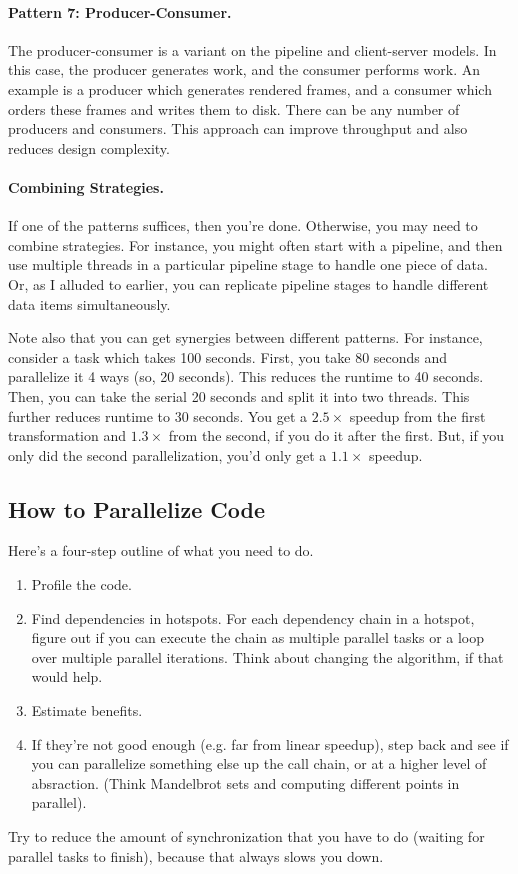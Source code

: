 \documentclass[a4paper]{report}
\begin{document}
\paragraph{Pattern 7: Producer-Consumer.} The producer-consumer is 
a variant on the pipeline and client-server models. In this case, the
producer generates work, and the consumer performs work. An example is
a producer which generates rendered frames, and a consumer which
orders these frames and writes them to disk. There can be any number
of producers and consumers. This approach can improve throughput
and also reduces design complexity.

\paragraph{Combining Strategies.} If one of the patterns suffices,
then you're done. Otherwise, you may need to combine strategies.
For instance, you might often start with a pipeline, and then 
use multiple threads in a particular pipeline stage to handle one
piece of data. Or, as I alluded to earlier, you can replicate
pipeline stages to handle different data items simultaneously.

Note also that you can get synergies between different patterns.
For instance, consider a task which takes 100 seconds. First, you
take 80 seconds and parallelize it 4 ways (so, 20 seconds). This
reduces the runtime to 40 seconds. Then, you can take the serial 
20 seconds and split it into two threads. This further reduces 
runtime to 30 seconds. You get a $2.5\times$ speedup from the
first transformation and $1.3\times$ from the second, if you do it
after the first. But, if you only did the second parallelization,
you'd only get a $1.1\times$ speedup.

\subsection*{How to Parallelize Code}
Here's a four-step outline of what you need to do.
\begin{enumerate}
\item Profile the code.
\item Find dependencies in hotspots. For each dependency chain in
a hotspot, figure out if you can execute the chain as
multiple parallel tasks or a loop over multiple parallel iterations.
Think about changing the algorithm, if that would help.
\item Estimate benefits. 
\item If they're not good enough (e.g. far from linear speedup),
step back and see if you can parallelize something else up the
call chain, or at a higher level of absraction.
(Think Mandelbrot sets and computing different points in parallel).
\end{enumerate}
Try to reduce the amount of synchronization that you have to do
(waiting for parallel tasks to finish), because that always slows
you down.
\end{document}
